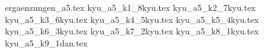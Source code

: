 
\usepackage{import}

	{ergaenzungen_a5.tex}\clearpage\pagebreak
	{kyu_a5_k1_8kyu.tex}\clearpage\pagebreak
	{kyu_a5_k2_7kyu.tex}\clearpage\pagebreak
	{kyu_a5_k3_6kyu.tex}\clearpage\pagebreak
	{kyu_a5_k4_5kyu.tex}\clearpage\pagebreak
	{kyu_a5_k5_4kyu.tex}\clearpage\pagebreak
	{kyu_a5_k6_3kyu.tex}\clearpage\pagebreak
	{kyu_a5_k7_2kyu.tex}\clearpage\pagebreak
	{kyu_a5_k8_1kyu.tex}\clearpage\pagebreak
	{kyu_a5_k9_1dan.tex}\clearpage\pagebreak
	\AddToShipoutPictureFG{\ShowDraft}

